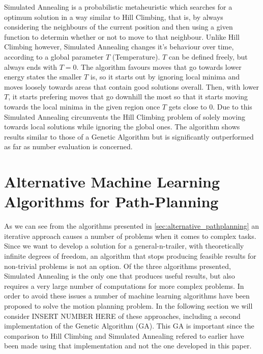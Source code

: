 Simulated Annealing is a probabilistic metaheuristic which searches for a optimum solution in a way similar to Hill Climbing, that is, by always considering the neighbours of the current position and then using a given function to determin whether or not to move to that neighbour. Unlike Hill Climbing however, Simulated Annealing changes it's behaviour over time, according to a global parameter $T$ (Temperature). $T$ can be defined freely, but always ends with $T=0$. The algorithm favours moves that go towards lower energy states the smaller $T$ is, so it starts out by ignoring local minima and moves loosely towards areas that contain good solutions overall. Then, with lower $T$, it starts prefering moves that go downhill the most so that it starts moving towards the local minima in the given region once $T$ gets close to $0$. Due to this Simulated Annealing circumvents the Hill Climbing problem of solely moving towards local solutions while ignoring the global ones. The algorithm shows results similar to those of a Genetic Algorithm but is significantly outperformed as far as number evaluation is concerned.\cite{8}


\section{Alternative Machine Learning Algorithms for Path-Planning}
\label{sec:alternative_machine_learning_pathplanning}

As we can see from the algorithms presented in \ref{sec:alternative_pathplanning} an iterative approach causes a number of problems when it comes to complex tasks. Since we want to develop a solution for a general-n-trailer, with theoretically infinite degrees of freedom, an algorithm that stops producing feasible results for non-trivial problems is not an option. Of the three algorithms presented, Simulated Annealing is the only one that produces useful results, but also requires a very large number of computations \cite{8} for more complex problems. In order to avoid these issues a number of machine learning algorithms have been proposed to solve the motion planning problem. In the following section we will consider INSERT NUMBER HERE of these approaches, including a second implementation of the Genetic Algorithm (GA). This  GA is important since the comparison to Hill Climbing and Simulated Annealing refered to earlier have been made using that implementation and not the one developed in this paper. \cite{8}

